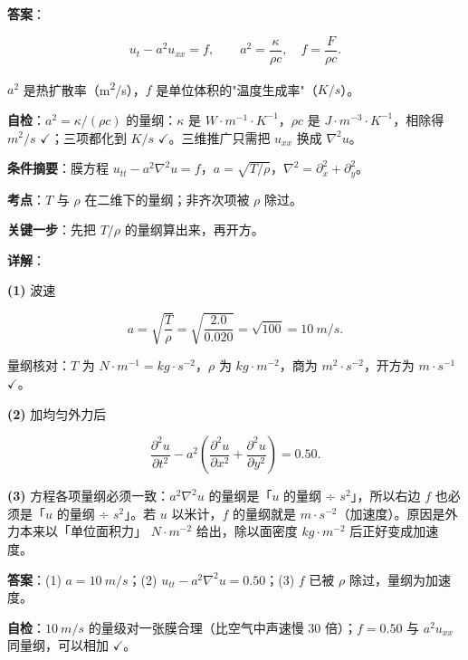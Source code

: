 \textbf{答案}：

\[
u_t-a^2u_{xx}=f,
\qquad
a^2=\frac{\kappa}{\rho c},\quad f=\frac{F}{\rho c}.
\]

$a^2$ 是热扩散率（\unit{m^2/s}），$f$ 是单位体积的"温度生成率"（$\unit{K/s}$）。

\textbf{自检}：$a^2=\kappa/(\rho c)$ 的量纲：$\kappa$ 是 $\unit{W\cdot m^{-1}\cdot K^{-1}}$，$\rho c$ 是 $\unit{J\cdot m^{-3}\cdot K^{-1}}$，相除得 $\unit{m^2/s}$ $\checkmark$；三项都化到 $\unit{K/s}$ $\checkmark$。三维推广只需把 $u_{xx}$ 换成 $\nabla^2u$。

\qbreak

\textbf{条件摘要}：膜方程 $u_{tt}-a^2\nabla^2u=f$，$a=\sqrt{T/\rho}$，$\nabla^2=\partial_x^2+\partial_y^2$。

\textbf{考点}：$T$ 与 $\rho$ 在二维下的量纲；非齐次项被 $\rho$ 除过。

\textbf{关键一步}：先把 $T/\rho$ 的量纲算出来，再开方。

\textbf{详解}：

\textbf{(1)} 波速

\[
a=\sqrt{\frac{T}{\rho}}=\sqrt{\frac{2.0}{0.020}}=\sqrt{100}=10\ \unit{m/s}.
\]

量纲核对：$T$ 为 $\unit{N\cdot m^{-1}}=\unit{kg\cdot s^{-2}}$，$\rho$ 为 $\unit{kg\cdot m^{-2}}$，商为 $\unit{m^2\cdot s^{-2}}$，开方为 $\unit{m\cdot s^{-1}}$ $\checkmark$。

\textbf{(2)} 加均匀外力后

\[
\frac{\partial^2u}{\partial t^2}-a^2\left(\frac{\partial^2u}{\partial x^2}+\frac{\partial^2u}{\partial y^2}\right)=0.50 .
\]

\textbf{(3)} 方程各项量纲必须一致：$a^2\nabla^2u$ 的量纲是「$u$ 的量纲 ÷ $\unit{s^2}$」，所以右边 $f$ 也必须是「$u$ 的量纲 ÷ $\unit{s^2}$」。若 $u$ 以米计，$f$ 的量纲就是 $\unit{m\cdot s^{-2}}$（加速度）。原因是外力本来以「单位面积力」 $\unit{N\cdot m^{-2}}$ 给出，除以面密度 $\unit{kg\cdot m^{-2}}$ 后正好变成加速度。

\textbf{答案}：(1) $a=10\ \unit{m/s}$；(2) $u_{tt}-a^2\nabla^2u=0.50$；(3) $f$ 已被 $\rho$ 除过，量纲为加速度。

\textbf{自检}：$10\ \unit{m/s}$ 的量级对一张膜合理（比空气中声速慢 30 倍）；$f=0.50$ 与 $a^2u_{xx}$ 同量纲，可以相加 $\checkmark$。



